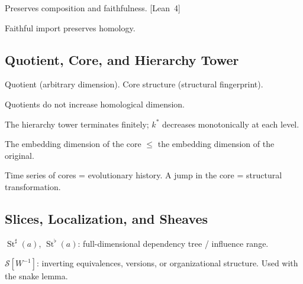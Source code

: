 \begin{theorem}
Preserves composition and faithfulness. \textup{[Lean~4]}
\end{theorem}

\begin{theorem}
Faithful import preserves homology.
\end{theorem}

\subsection{Quotient, Core, and Hierarchy Tower}

\begin{definition}
Quotient (arbitrary dimension). Core structure (structural fingerprint).
\end{definition}

\begin{theorem}
Quotients do not increase homological dimension.
\end{theorem}

\begin{corollary}
The hierarchy tower terminates finitely; $k^*$ decreases monotonically at each level.
\end{corollary}

\begin{corollary}
The embedding dimension of the core $\leq$ the embedding dimension of the original.
\end{corollary}

\begin{remark}
Time series of cores = evolutionary history. A jump in the core = structural transformation.
\end{remark}

\subsection{Slices, Localization, and Sheaves}

\begin{definition}
$\operatorname{St}^\sharp(a)$, $\operatorname{St}^\flat(a)$: full-dimensional dependency tree / influence range.
\end{definition}

\begin{definition}[Localization]
$\mathcal{S}[W^{-1}]$: inverting equivalences, versions, or organizational structure. Used with the snake lemma.
\end{definition}

